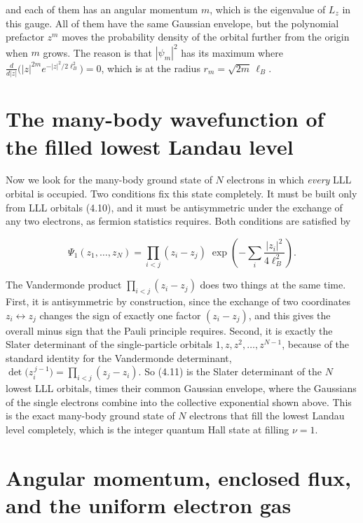 and each of them has an angular momentum $m$, which is the eigenvalue of $L_z$ in this gauge. All
of them have the same Gaussian envelope, but the polynomial prefactor $z^m$ moves the probability
density of the orbital further from the origin when $m$ grows. The reason is that $|\psi_m|^2$ has
its maximum where $\tfrac{d}{d|z|}\big(|z|^{2m}e^{-|z|^2/2\ell_B^2}\big)=0$, which is at the radius
$r_m = \sqrt{2m}\,\ell_B$.

\section{The many-body wavefunction of the filled lowest Landau level}

Now we look for the many-body ground state of $N$ electrons in which \emph{every} LLL orbital is
occupied. Two conditions fix this state completely. It must be built only from LLL orbitals (4.10),
and it must be antisymmetric under the exchange of any two electrons, as fermion statistics
requires. Both conditions are satisfied by

\begin{equation}
\Psi_1(z_1,\dots,z_N) = \prod_{i<j}(z_i-z_j)\; \exp\!\left(-\sum_i \frac{|z_i|^2}{4\ell_B^2}\right).
\end{equation}

The Vandermonde product $\prod_{i<j}(z_i-z_j)$ does two things at the same time. First, it is
antisymmetric by construction, since the exchange of two coordinates $z_i\leftrightarrow z_j$
changes the sign of exactly one factor $(z_i-z_j)$, and this gives the overall minus sign that the
Pauli principle requires. Second, it is exactly the Slater determinant of the single-particle
orbitals $1,z,z^2,\dots,z^{N-1}$, because of the standard identity for the Vandermonde determinant,
$\det\!\big(z_i^{\,j-1}\big) = \prod_{i<j}(z_j-z_i)$. So (4.11) is the Slater determinant of the
$N$ lowest LLL orbitals, times their common Gaussian envelope, where the Gaussians of the single
electrons combine into the collective exponential shown above. This is the exact many-body ground
state of $N$ electrons that fill the lowest Landau level completely, which is the integer quantum
Hall state at filling $\nu=1$.

\section{Angular momentum, enclosed flux, and the uniform electron gas}


